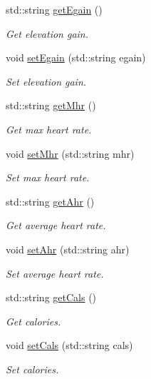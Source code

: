 \begin{DoxyCompactItemize}
std\+::string \mbox{\hyperlink{classRunDataContainer_a388bf5b9126f25d0a684a7d6e488390d}{get\+Egain}} ()
\begin{DoxyCompactList}\small\item\em Get elevation gain. \end{DoxyCompactList}\item 
void \mbox{\hyperlink{classRunDataContainer_ab33726fac3656f80cf6d43bd195e0914}{set\+Egain}} (std\+::string egain)
\begin{DoxyCompactList}\small\item\em Set elevation gain. \end{DoxyCompactList}\item 
std\+::string \mbox{\hyperlink{classRunDataContainer_ac1b5ca00fdaa39a45b2a941512fda6b0}{get\+Mhr}} ()
\begin{DoxyCompactList}\small\item\em Get max heart rate. \end{DoxyCompactList}\item 
void \mbox{\hyperlink{classRunDataContainer_a08abdd019d8436446faba4de57f20b12}{set\+Mhr}} (std\+::string mhr)
\begin{DoxyCompactList}\small\item\em Set max heart rate. \end{DoxyCompactList}\item 
std\+::string \mbox{\hyperlink{classRunDataContainer_a978ce6398408f438b78acb6ddffcb83e}{get\+Ahr}} ()
\begin{DoxyCompactList}\small\item\em Get average heart rate. \end{DoxyCompactList}\item 
void \mbox{\hyperlink{classRunDataContainer_a1d36dd4b6622ecfd1aa10453495f9858}{set\+Ahr}} (std\+::string ahr)
\begin{DoxyCompactList}\small\item\em Set average heart rate. \end{DoxyCompactList}\item 
std\+::string \mbox{\hyperlink{classRunDataContainer_a0b3486627bcfb6b5043035a7446139aa}{get\+Cals}} ()
\begin{DoxyCompactList}\small\item\em Get calories. \end{DoxyCompactList}\item 
void \mbox{\hyperlink{classRunDataContainer_ad45c3d94c2db1e3be8716ac04e07990a}{set\+Cals}} (std\+::string cals)
\begin{DoxyCompactList}\small\item\em Set calories. \end{DoxyCompactList}\item 

\end{DoxyCompactItemize}
